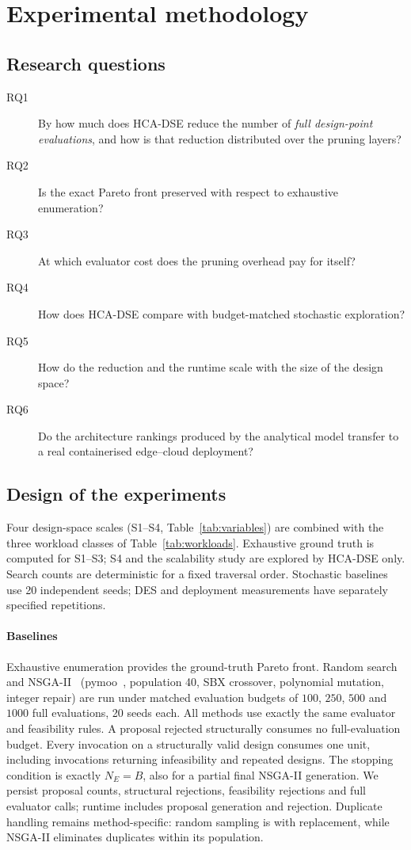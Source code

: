 \section{Experimental methodology}
\label{sec:methodology}

\subsection{Research questions}
\begin{description}
\item[RQ1] By how much does HCA-DSE reduce the number of \emph{full design-point
  evaluations}, and how is that reduction distributed over the pruning layers?
\item[RQ2] Is the exact Pareto front preserved with respect to exhaustive enumeration?
\item[RQ3] At which evaluator cost does the pruning overhead pay for itself?
\item[RQ4] How does HCA-DSE compare with budget-matched stochastic exploration?
\item[RQ5] How do the reduction and the runtime scale with the size of the design space?
\item[RQ6] Do the architecture rankings produced by the analytical model transfer to a
  real containerised edge--cloud deployment?
\end{description}

\subsection{Design of the experiments}
Four design-space scales (S1--S4, Table~\ref{tab:variables}) are combined with the three
workload classes of Table~\ref{tab:workloads}. Exhaustive ground truth is computed for
S1--S3; S4 and the scalability study are explored by HCA-DSE only. Search counts are deterministic for a fixed traversal order. Stochastic baselines use 20 independent seeds; DES and deployment measurements have separately specified repetitions.

\paragraph{Baselines}
Exhaustive enumeration provides the ground-truth Pareto front. Random search and
NSGA-II~\cite{deb2002nsga2} (pymoo~\cite{blank2020pymoo}, population 40, SBX crossover,
polynomial mutation, integer repair) are run under matched evaluation budgets of
$100$, $250$, $500$ and $1000$ full evaluations, 20 seeds each. All methods use exactly
the same evaluator and feasibility rules. A proposal rejected structurally consumes no
full-evaluation budget. Every invocation on a structurally valid design consumes one unit,
including invocations returning infeasibility and repeated designs. The stopping condition
is exactly $N_E=B$, also for a partial final NSGA-II generation. We persist proposal counts,
structural rejections, feasibility rejections and full evaluator calls; runtime includes
proposal generation and rejection. Duplicate handling remains method-specific: random
sampling is with replacement, while NSGA-II eliminates duplicates within its population.

